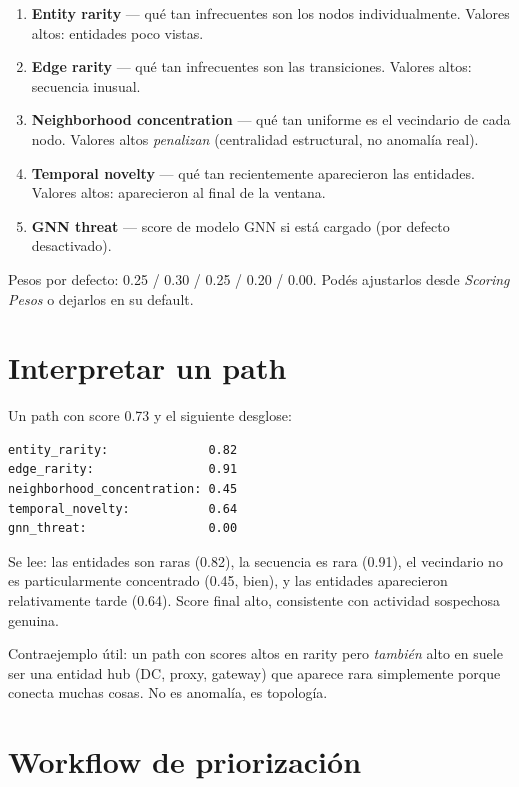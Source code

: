 \begin{enumerate}
    \item \textbf{Entity rarity} — qué tan infrecuentes son los
    nodos individualmente. Valores altos: entidades poco vistas.
    \item \textbf{Edge rarity} — qué tan infrecuentes son las
    transiciones. Valores altos: secuencia inusual.
    \item \textbf{Neighborhood concentration} — qué tan uniforme es
    el vecindario de cada nodo. Valores altos \emph{penalizan}
    (centralidad estructural, no anomalía real).
    \item \textbf{Temporal novelty} — qué tan recientemente
    aparecieron las entidades. Valores altos: aparecieron al final
    de la ventana.
    \item \textbf{GNN threat} — score de modelo GNN si está
    cargado (por defecto desactivado).
\end{enumerate}

Pesos por defecto: 0.25 / 0.30 / 0.25 / 0.20 / 0.00. Podés
ajustarlos desde \emph{Scoring \textrightarrow{} Pesos} o dejarlos
en su default.

\section{Interpretar un path}

Un path con score 0.73 y el siguiente desglose:

\begin{lstlisting}[basicstyle=\ttfamily\small]
entity_rarity:              0.82
edge_rarity:                0.91
neighborhood_concentration: 0.45
temporal_novelty:           0.64
gnn_threat:                 0.00
\end{lstlisting}

Se lee: las entidades son raras (0.82), la secuencia es rara
(0.91), el vecindario no es particularmente concentrado (0.45,
bien), y las entidades aparecieron relativamente tarde (0.64).
Score final alto, consistente con actividad sospechosa genuina.

Contraejemplo útil: un path con scores altos en rarity pero
\emph{también} alto en  suele ser
una entidad hub (DC, proxy, gateway) que aparece rara simplemente
porque conecta muchas cosas. No es anomalía, es topología.

\section{Workflow de priorización}

